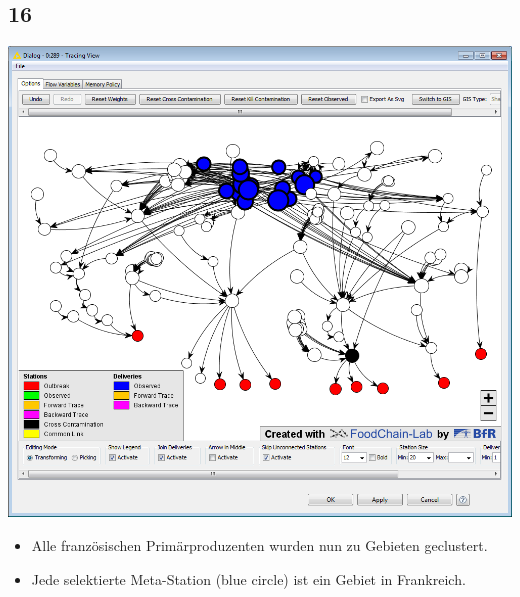 \documentclass{beamer}
\begin{document}
\subsection{16}
\begin{frame}
	\begin{center}
  		\includegraphics[height=0.6\textheight]{16.png}
	\end{center}
	\begin{itemize}
		\item Alle französischen Primärproduzenten wurden nun zu Gebieten geclustert.
		\item Jede selektierte Meta-Station (blue circle) ist ein Gebiet in Frankreich.		
	\end{itemize}
\end{frame}
\end{document}

